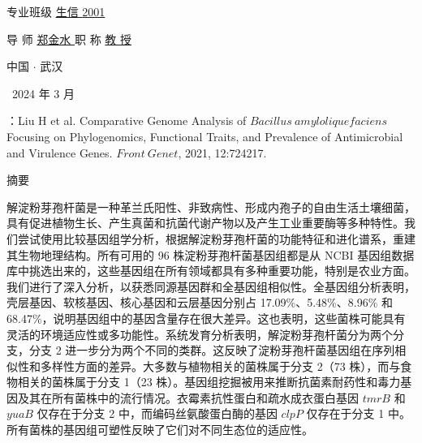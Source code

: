 \documentclass[UTF8]{ctexart}
\begin{document}
\vspace{8mm}

{ \heiti \fontsize{18}{18} \noindent 专业班级 \quad \underline{ \hspace*{4.65cm} 生信 { 2001} \hspace*{4.65cm}}
}

\vspace{13mm}

{ \heiti \fontsize{18}{18} \noindent 
导 \hspace{1cm} 师  \quad \underline{\hspace{1.2cm} 郑金水 \hspace{1.2cm}} \quad  职 \hspace{1cm} 称   \quad \underline{\hspace{1.15cm} 教 \hspace{0.5cm} 授 \hspace{1.15cm}} 
}

\vspace{10mm}

\begin{center}
    \heiti {}
    中国 $\cdot$ 武汉
    
    \ 2024 年 3 月
\end{center}


\clearpage

\begin{center}
    \noindent {}   
\end{center}


\quad 

{}：Liu H et al. Comparative Genome Analysis of $Bacillus~amyloliquefaciens$ Focusing on Phylogenomics, Functional Traits, and Prevalence of Antimicrobial and Virulence Genes. $Front~Genet$, 2021, 12:724217.

\quad

\setcounter{page}{1}

{\noindent \heiti{} {摘要}}

\vspace{3mm}

解淀粉芽孢杆菌是一种革兰氏阳性、非致病性、形成内孢子的自由生活土壤细菌，具有促进植物生长、产生真菌和抗菌代谢产物以及产生工业重要酶等多种特性。我们尝试使用比较基因组学分析，根据解淀粉芽孢杆菌的功能特征和进化谱系，重建其生物地理结构。所有可用的 96 株淀粉芽孢杆菌基因组都是从 NCBI 基因组数据库中挑选出来的，这些基因组在所有领域都具有多种重要功能，特别是农业方面。我们进行了深入分析，以获悉同源基因群和全基因组相似性。全基因组分析表明，壳层基因、软核基因、核心基因和云层基因分别占 17.09\%、5.48\%、8.96\% 和 68.47\%，说明基因组中的基因含量存在很大差异。这也表明，这些菌株可能具有灵活的环境适应性或多功能性。系统发育分析表明，解淀粉芽孢杆菌分为两个分支，分支 2 进一步分为两个不同的类群。这反映了淀粉芽孢杆菌基因组在序列相似性和多样性方面的差异。大多数与植物相关的菌株属于分支 2（73 株），而与食物相关的菌株属于分支 1（23 株）。基因组挖掘被用来推断抗菌素耐药性和毒力基因及其在所有菌株中的流行情况。衣霉素抗性蛋白和疏水成衣蛋白基因 $tmrB$ 和 $yuaB$ 仅存在于分支 2 中，而编码丝氨酸蛋白酶的基因 $clpP$ 仅存在于分支 1 中。所有菌株的基因组可塑性反映了它们对不同生态位的适应性。
\end{document}
